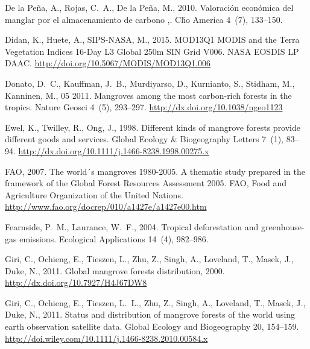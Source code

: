 \documentclass[review, authoryear]{elsarticle}   	%
\begin{document}
\begin{thebibliography}{51}
{De la Pe\~{n}a}, A., Rojas, C.~A., {De la Pe\~{n}a}, M., 2010. {Valoraci\'{o}n
  econ\'{o}mica del manglar por el almacenamiento de carbono ,}. Cl\'{\i}o
  America 4~(7), 133--150.

Didan, K., Huete, A., SIPS-NASA, M., 2015. {MOD13Q1 MODIS and the Terra
  Vegetation Indices 16-Day L3 Global 250m SIN Grid V006. NASA EOSDIS LP DAAC}.
\newline\urlprefix\url{http://doi.org/10.5067/MODIS/MOD13Q1.006}

Donato, D.~C., Kauffman, J.~B., Murdiyarso, D., Kurnianto, S., Stidham, M.,
  Kanninen, M., 05 2011. Mangroves among the most carbon-rich forests in the
  tropics. Nature Geosci 4~(5), 293--297.
\newline\urlprefix\url{http://dx.doi.org/10.1038/ngeo1123}

Ewel, K., Twilley, R., Ong, J., 1998. Different kinds of mangrove forests
  provide different goods and services. Global Ecology \& Biogeography Letters
  7~(1), 83--94.
\newline\urlprefix\url{http://dx.doi.org/10.1111/j.1466-8238.1998.00275.x}

{FAO}, 2007. {The world´s mangroves 1980-2005. A thematic study prepared in
  the framework of the Global Forest Resources Assessment 2005}. FAO, Food and
  Agriculture Organization of the United Nations.
\newline\urlprefix\url{http://www.fao.org/docrep/010/a1427e/a1427e00.htm}

Fearnside, P.~M., Laurance, W.~F., 2004. {Tropical deforestation and
  greenhouse-gas emissions}. Ecological Applications 14~(4), 982--986.

Giri, C., Ochieng, E., Tieszen, L., Zhu, Z., Singh, A., Loveland, T., Masek,
  J., Duke, N., 2011{}. Global mangrove forests distribution, 2000.
\newline\urlprefix\url{http://dx.doi.org/10.7927/H4J67DW8}

Giri, C., Ochieng, E., Tieszen, L.~L., Zhu, Z., Singh, A., Loveland, T., Masek,
  J., Duke, N., 2011{}. {Status and distribution of mangrove
  forests of the world using earth observation satellite data}. Global Ecology
  and Biogeography 20, 154--159.
\newline\urlprefix\url{http://doi.wiley.com/10.1111/j.1466-8238.2010.00584.x}


\end{thebibliography}
\end{document}
